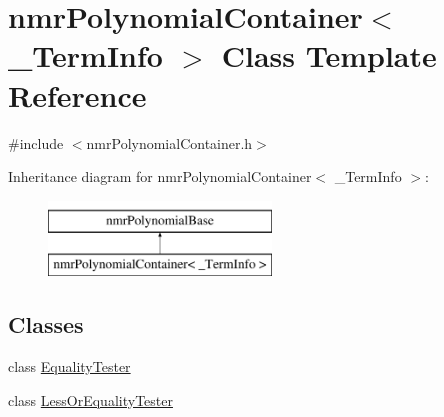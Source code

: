 \hypertarget{classnmr_polynomial_container}{}\section{nmr\+Polynomial\+Container$<$ \+\_\+\+Term\+Info $>$ Class Template Reference}
\label{classnmr_polynomial_container}


{\ttfamily \#include $<$nmr\+Polynomial\+Container.\+h$>$}

Inheritance diagram for nmr\+Polynomial\+Container$<$ \+\_\+\+Term\+Info $>$\+:\begin{figure}[H]
\begin{center}
\leavevmode
\includegraphics[height=2.000000cm]{d5/dca/classnmr_polynomial_container}
\end{center}
\end{figure}
\subsection*{Classes}
\begin{DoxyCompactItemize}
\item 
class \hyperlink{classnmr_polynomial_container_1_1_equality_tester}{Equality\+Tester}
\item 
class \hyperlink{classnmr_polynomial_container_1_1_less_or_equality_tester}{Less\+Or\+Equality\+Tester}
\end{DoxyCompactItemize}
